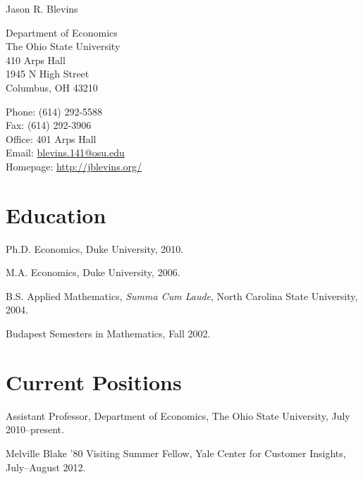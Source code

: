 \documentclass[10pt,letterpaper]{article}
\def\name{Jason R. Blevins}
\renewenvironment{itemize}{
  \begin{list}{}{
    \setlength{\leftmargin}{1.5em}
    \setlength{\itemsep}{0.25em}
    \setlength{\parskip}{0pt}
    \setlength{\parsep}{0.25em}
  }
}{
  \end{list}
}
\begin{document}
{\huge \name}


\bigskip

\begin{minipage}[t]{0.495\textwidth}
  Department of Economics \\
  The Ohio State University \\
  410 Arps Hall \\
  1945 N High Street \\
  Columbus, OH 43210
\end{minipage}
\begin{minipage}[t]{0.495\textwidth}
  Phone: (614) 292-5588 \\
  Fax: (614) 292-3906 \\
  Office: 401 Arps Hall \\
  Email: \href{mailto:blevins.141@osu.edu}{blevins.141@osu.edu} \\
  Homepage: \href{http://jblevins.org/}{http://jblevins.org/}
\end{minipage}

\section*{Education}

\begin{itemize}
  \item Ph.D. Economics, Duke University, 2010.
  \item M.A. Economics, Duke University, 2006.
  \item B.S. Applied Mathematics, \textit{Summa Cum Laude},
    North Carolina State University, 2004.
  \item Budapest Semesters in Mathematics, Fall 2002.
\end{itemize}

\section*{Current Positions}

\begin{itemize}
\item Assistant Professor, Department of Economics, The Ohio State University,
  July 2010--present.
\item Melville Blake '80 Visiting Summer Fellow,
  Yale Center for Customer Insights, July--August 2012.
\end{itemize}
\end{document}
